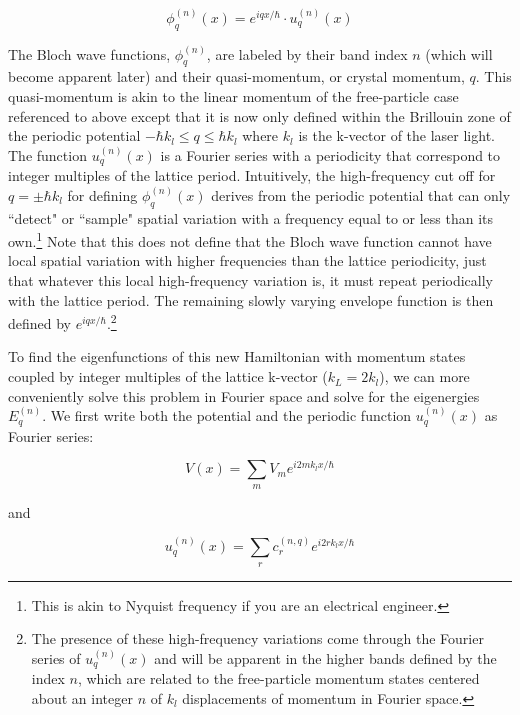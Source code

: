\begin{equation}
\label{eqn:blochFx}
\phi_q^{(n)} (x) = e^{i q x/\hbar} \cdot u_q^{(n)}(x)
\end{equation}

The Bloch wave functions, $\phi_q^{(n)}$, are labeled by their band index $n$ (which will become apparent later) and their quasi-momentum, or crystal momentum, $q$. This quasi-momentum is akin to the linear momentum of the free-particle case referenced to above except that it is now only defined within the Brillouin zone of the periodic potential $- \hbar k_l \leq q \leq \hbar k_{l}$ where $k_l$ is the k-vector of the laser light. The function $u_q^{(n)}(x)$ is a Fourier series with a periodicity that correspond to integer multiples of the lattice period. Intuitively, the high-frequency cut off for $q=\pm \hbar k_l$ for defining $\phi^{(n)}_q(x)$ derives from the periodic potential that can only ``detect" or ``sample" spatial variation with a frequency equal to or less than its own.\footnote{This is akin to Nyquist frequency if you are an electrical engineer.} Note that this does not define that the Bloch wave function cannot have local spatial variation with higher frequencies than the lattice periodicity, just that whatever this local high-frequency variation is, it must repeat periodically with the lattice period. The remaining slowly varying envelope function is then defined by $e^{iqx/\hbar}$.\footnote{The presence of these high-frequency variations come through the Fourier series of $u_q^{(n)}(x)$ and will be apparent in the higher bands defined by the index $n$, which are related to the free-particle momentum states centered about an integer $n$ of $k_l$ displacements of momentum in Fourier space.}

To find the eigenfunctions of this new Hamiltonian with momentum states coupled by integer multiples of the lattice k-vector ($k_L=2 k_l$), we can more conveniently solve this problem in Fourier space and solve for the eigenergies $E_q^{(n)}$. We first write both the potential and the periodic function $u_q^{(n)}(x)$ as Fourier series:

\begin{equation}
\label{eqn:FSV}
V(x) = \sum_m V_m e^{i 2 m k_l x/\hbar}
\end{equation}

and

\begin{equation}
\label{eqn:ux}
u_q^{(n)}(x) = \sum_r c_r^{(n,q)} e^{i 2 r k_l x/\hbar}
\end{equation}

